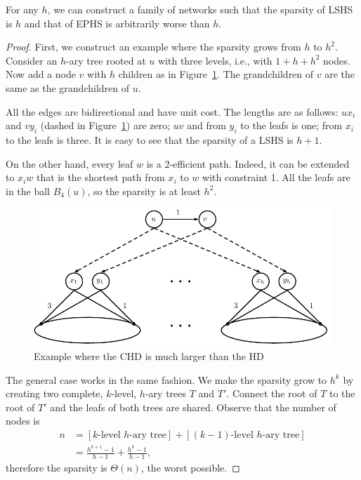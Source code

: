 \begin{proposition}\label{prop:treelike}
For any $h$, we can construct a family of networks such that the sparsity of LSHS is $h$ and that of EPHS is arbitrarily worse than $h$.
\end{proposition}
\begin{proof}
First, we construct an example where the sparsity grows from $h$ to $h^2$.
Consider an $h$-ary tree rooted at $u$ with three levels, i.e., with $1+h+h^2$ nodes.
Now add a node $v$ with $h$ children as in Figure~\ref{fig:treelike}. 
The grandchildren of $v$ are the same as the grandchildren of $u$.

All the edges are bidirectional and have unit cost.
The lengths are as follows: $ux_i$ and $vy_i$ (dashed in Figure~\ref{fig:treelike}) are zero; $uv$ and from $y_i$ to the leafs is one; from $x_i$ to the leafs is three.
It is easy to see that the sparsity of a LSHS is $h+1$.

On the other hand, every leaf $w$ is a $2$-efficient path.
Indeed, it can be extended to $x_iw$ that is the shortest path from $x_i$ to $w$ with constraint 1.
All the leafs are in the ball $B_4(u)$, so the sparsity is at least $h^2$.

\begin{figure}
\caption{Example where the CHD is much larger than the HD}
\label{fig:treelike}
\centering
\includegraphics[scale=0.6]{TexImg/Treelike.pdf}
\end{figure}

The general case works in the same fashion.
We make the sparsity grow to $h^k$ by creating two complete, $k$-level, $h$-ary trees $T$ and $T'$.
Connect the root of $T$ to the root of $T'$ and the leafs of both trees are shared.
Observe that the number of nodes is 
\begin{align*}
n &=[\text{$k$-level $h$-ary tree}] + [\text{$(k-1)$-level $h$-ary tree}]\\
&= \frac{h^{k+1}-1}{h-1} + \frac{h^k-1}{h-1},
\end{align*}
therefore the sparsity is $\Theta(n)$, the worst possible.
\end{proof}